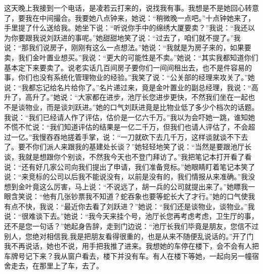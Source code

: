 \documentclass[12pt,oneside]{book}
\begin{document}
这天晚上我接到一个电话，是凌若云打来的，说找我有事。我想是不是她回心转意了，要我在中间撮合。我要她八点钟来，她说：``稍微晚一点吧。''十点钟她来了，手里提了什么送给我。她坐下说：``听说你手中的绵绣大厦要卖？''我说：``我还以为你要跟我说刘跃进的事呢。''她甜甜地笑了说：``过去了，咱们就不提了。''我说：``那我们说房子，刚刚有这么一点想法。''她说：``我就是为房子来的，如果要卖，我们金叶置业想买。''我说：``更大的可能性是不卖。''她说：``其实我都知道你们基本定下来要卖了。说老实话几百间房子要你们一间间租出去，也不是件容易的事，你们也没有系统化管理物业的经验。''我笑了说：``公关部的经理来攻关了。''她说：``我都忘记给名片给你了。''名片递过来，竟是金叶置业的副总经理，我说：``高升了，高升了。''她说：``大家都在进步，池厅长您进步更快，不然我们坐在一起也不是谈物业，而是谈刘跃进。''她的口气刘跃进竟是比物业低了多少个档次的话题。我说：``我们已经请人作了评估，估价是一亿六千万。''我以为会吓她一跳，谁知她不慌不忙说：``我们知道评估的结果是一亿二千万，但我们也请人评估了，不会超过一亿。''我慢吞吞地搓着手掌，说：``一刀就砍下去几千万，这样谈就谈不下去了。要不你们派人来跟我的基建处长谈？''她轻轻地笑了说：``当然是要跟池厅长谈，我就是想跟你个别谈，不然我今天也不登门拜访了。''我把笔记本打开看了看说：``还有好几家公司向我们提出了申请，我们准备竞标。''她眼睛盯着笔记本笑了说：``来竞标的公司以后我不能说没有，以前是没有的，我们情报从来准确。''我没想到金叶竟这么厉害，马上说：``不说远了，胡一兵的公司就提出来了。''她瞟我一眼含笑说：``他有几张钞票我不知道？蛇吞象也要等蛇长大了才行。''她的口气使我有点不快，我说：``最近你去看了刘跃进？''她说：``我们还是谈物业，谈物业。''我说：``很难谈下去。''她说：``我今天来挂个号，池厅长您再考虑考虑，卫生厅的事，还不是您一句话？''她起身告辞，走到门边说：``池厅长我们毕竟是朋友，您信不过别人，您绝对相信我,我是把朋友看得很重的，也是从来不随便乱说话的。''开了门我不再说话，她也不说，用手把我推了进来。我想她的车停在楼下，会不会有人把车牌号记下来？我从窗户看去，楼下并没有车。有人在楼下等她，一起向另一幢宿舍走去，在那里上了车，去了。
\end{document}
